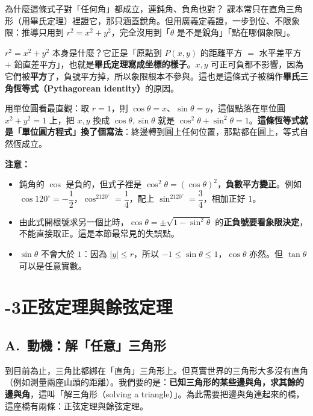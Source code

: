 \documentclass[11pt]{article}
\begin{document}
\begin{補充框}{為什麼這條式子對「任何角」都成立，連鈍角、負角也對？}
課本常只在直角三角形（用畢氏定理）裡證它，那只涵蓋銳角。但用廣義定義證，一步到位、不限象限：推導只用到 $r^2=x^2+y^2$，完全沒用到「$\theta$ 是不是銳角」「點在哪個象限」。

$r^2=x^2+y^2$ 本身是什麼？它正是「原點到 $P(x,y)$ 的距離平方 $=$ 水平差平方 $+$ 鉛直差平方」，也就是\textbf{畢氏定理寫成坐標的樣子}。$x,y$ 可正可負都不影響，因為它們被\textbf{平方}了，負號平方掉，所以象限根本不參與。這也是這條式子被稱作\textbf{畢氏三角恆等式（Pythagorean identity）}的原因。

用單位圓看最直觀：取 $r=1$，則 $\cos\theta=x$、$\sin\theta=y$，這個點落在單位圓 $x^2+y^2=1$ 上，把 $x,y$ 換成 $\cos\theta,\sin\theta$ 就是 $\cos^2\theta+\sin^2\theta=1$。\textbf{這條恆等式就是「單位圓方程式」換了個寫法}：終邊轉到圓上任何位置，那點都在圓上，等式自然恆成立。

\textbf{注意：}
\begin{itemize}\setlength{\itemsep}{1pt}
\item 鈍角的 $\cos$ 是負的，但式子裡是 $\cos^2\theta=(\cos\theta)^2$，\textbf{負數平方變正}。例如 $\cos120^\circ=-\dfrac12$，$\cos^2120^\circ=\dfrac14$，配上 $\sin^2120^\circ=\dfrac34$，相加正好 $1$。
\item 由此式開根號求另一個比時，$\cos\theta=\pm\sqrt{1-\sin^2\theta}$ 的\textbf{正負號要看象限決定}，不能直接取正。這是本節最常見的失誤點。
\item $\sin\theta$ 不會大於 $1$：因為 $|y|\le r$，所以 $-1\le\sin\theta\le1$，$\cos\theta$ 亦然。但 $\tan\theta$ 可以是任意實數。
\end{itemize}
\end{補充框}

\section*{-3\quad 正弦定理與餘弦定理}

\subsection*{\sffamily A.\ 動機：解「任意」三角形}

到目前為止，三角比都綁在「直角」三角形上。但真實世界的三角形大多沒有直角（例如測量兩座山頭的距離）。我們要的是：\textbf{已知三角形的某些邊與角，求其餘的邊與角}，這叫「解三角形（solving a triangle）」。為此需要把邊與角連起來的橋，這座橋有兩條：正弦定理與餘弦定理。
\end{document}
